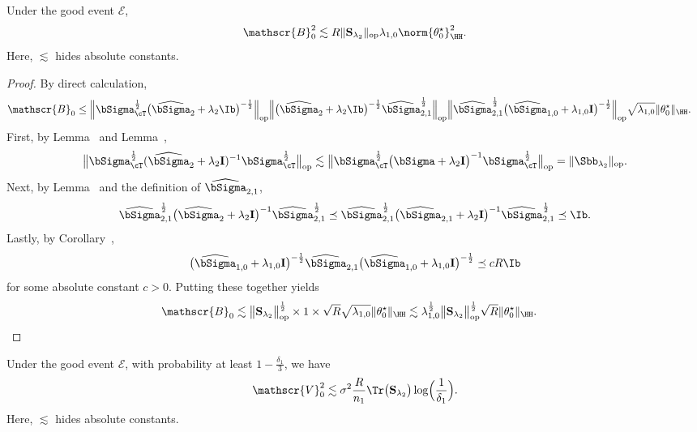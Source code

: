 \documentclass[12pt,a4paper,pdftex,onepage]{article}
\newcommand{\Sighat}{\widehat{{\bSigma}}}
\newcommand{\op}{\operatorname{op}}
\newcommand{\sig}{\sigma}
\newcommand{\Sbar}{\mathbf{S}}
\newcommand{\event}{\mathscr{E}}
\begin{document}
\begin{lemma}\label{lemma; bounding B_0}
Under the good event \(\event\),
\[
\mathscr{B}_0^2 \lesssim R  \|\Sbar_{\lambda_2} \|_{\op}\lambda_{1,0}\norm{\theta^\star_0}_{\HH}^2.
\]
Here, \(\lesssim\) hides absolute constants.
\end{lemma}

\begin{proof}
By direct calculation,
\begin{align*}
\mathscr{B}_0 
&\leq \Bigl\|\bSigma_\cT^{\frac{1}{2}}\bigl(\Sighat_{2}+ \lambda_2 \Ib\bigr)^{-\frac{1}{2}} \Bigr\|_{\op} 
\Bigl\|\bigl(\Sighat_{2}+ \lambda_2 \Ib\bigr)^{-\frac{1}{2}} \Sighat_{2,1}^{\frac{1}{2}}\Bigr\|_{\op} 
\Bigl\|\Sighat_{2,1}^{\frac{1}{2}} \bigl(\Sighat_{1,0}+\lambda_{1,0} \mathbf{I}\bigr)
^{-\frac{1}{2}} \Bigr\|_{\op} 
\sqrt{\lambda_{1,0}}\|\theta_0^\star\|_{\HH}.
\end{align*}
First, by Lemma~ and Lemma~, 
\[
\bigl\| \bSigma_{\cT}^{\frac{1}{2}} (\Sighat_2 + \lambda_2 \mathbf{I})^{-1}\bSigma_{\cT}^{\frac{1}{2}}   \bigr\|_{\op} 
\lesssim  \bigl\| \bSigma_{\cT}^{\frac{1}{2}} \bigl(\bSigma + \lambda_2 \mathbf{I}\bigr)^{-1}\bSigma_{\cT}^{\frac{1}{2}} \bigr\|_{\op} 
=\|\Sbb_{\lambda_2} \|_{\op}.
\]
Next, by Lemma~ and the definition of \(\Sighat_{2,1}\),
\[
\Sighat_{2,1}^{\frac{1}{2}} \bigl(\Sighat_2 + \lambda_2 \mathbf{I}\bigr)^{-1}  \Sighat_{2,1}^{\frac{1}{2}} 
\preceq  \Sighat_{2,1}^{\frac{1}{2}}  \bigl(\Sighat_{2,1} + \lambda_2 \mathbf{I}\bigr)^{-1}  \Sighat_{2,1}^{\frac{1}{2}}  
\preceq \Ib.
\]
Lastly, by Corollary~,
\[
\bigl(\Sighat_{1,0}+\lambda_{1,0} \mathbf{I}\bigr)
^{-\frac{1}{2}}\Sighat_{2,1} \bigl(\Sighat_{1,0}+\lambda_{1,0} \mathbf{I}\bigr)
^{-\frac{1}{2}}  \preceq  cR \Ib
\]
for some absolute constant \(c>0\).
Putting these together yields
\begin{align*}
\mathscr{B}_0 
&\lesssim \bigl\|\Sbar_{\lambda_2} \bigr\|_{\op}^{\frac{1}{2}} \times 1 \times \sqrt{R}\sqrt{\lambda_{1,0}}\|\theta_0^\star\|_{\HH} 
\lesssim \lambda_{1,0}^{\frac{1}{2}}\bigl\|\Sbar_{\lambda_2} \bigr\|_{\op}^{\frac{1}{2}} \sqrt{R}\|\theta_0^\star\|_{\HH}.
\end{align*}
\end{proof}


\begin{lemma}\label{lemma; bounding V_0}
Under the good event \(\event\), with probability at least \(1-\frac{\delta_1}{3}\), we have 
\[
\mathscr{V}_0^2 \lesssim \sig^2 \frac{R}{n_1}\Tr\bigl(\Sbar_{\lambda_2}\bigr)\log\Bigl(\frac{1}{\delta_1}\Bigr).
\]
Here, \(\lesssim\) hides absolute constants.
\end{lemma}
\end{document}
